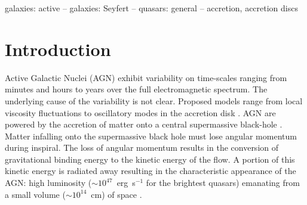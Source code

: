 \documentclass[a4paper,fleqn,usenatbib]{mnras}
\begin{document}
\begin{keywords}
galaxies: active -- galaxies: Seyfert -- quasars: general -- accretion, accretion discs
\end{keywords}



\section[Introduction]{Introduction}\label{sec:Introduction}

Active Galactic Nuclei (AGN) exhibit variability on time-scales ranging from minutes and hours to years over the full electromagnetic spectrum. The underlying cause of the variability is not clear. Proposed models range from local viscosity fluctuations to oscillatory modes in the accretion disk \citep{UrryARAA}. AGN are powered by the accretion of matter onto a central supermassive black-hole \citep{ReesARAA}. Matter infalling onto the supermassive black hole must lose angular momentum during inspiral. The loss of angular momentum results in the conversion of gravitational binding energy to the kinetic energy of the flow. A portion of this kinetic energy is radiated away resulting in the characteristic appearance of the AGN: high luminosity ($\sim 10^{47}$~erg~s$^{-1}$ for the brightest quasars) emanating from a small volume ($\sim 10^{14}$~cm) of space \citep{Edelson96}.
\end{document}
